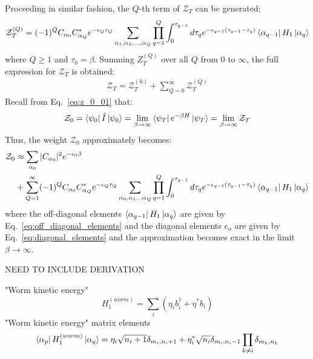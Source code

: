 \documentclass[12pt, two sided]{article}
\begin{document}
Proceeding in similar fashion, the $Q$-th term of $\mathcal{Z}_T$ can be generated:
\begin{equation}
\label{eq:Z^q}
\mathcal{Z}_T^{(Q)} = (-1)^{Q}  C_{\alpha_0} C_{\alpha_Q}^* e^{-\epsilon_{Q} \tau_Q} \sum_{\alpha_1,\alpha_2,\dots,\alpha_Q} \prod_{q=1}^Q \int_0^{\tau_{q-1}} d\tau_q e^{-\epsilon_{q-1}(\tau_{q-1}-\tau_q)} 
\bra{\alpha_{q-1}} H_1 \ket{\alpha_q}
\end{equation}
where $Q \geq 1$ and $\tau_0 = \beta$. Summing $Z_T^{(Q)}$ over all $Q$ from $0$ to $\infty$, the full expression for $\mathcal{Z}_T$ is obtained:
%
\begin{equation}
\begin{aligned}
\mathcal{Z}_T = \mathcal{Z}_T^{(0)} + \sum_{Q=0}^{\infty} \mathcal{Z}_T^{(Q)}
\end{aligned}
\end{equation}
%
Recall from Eq.~\eqref{eq:z_0_01} that:
%
\begin{equation}
\mathcal{Z}_0 = \bra{\psi_0} \hat{I} \ket{\psi_0} = \lim_{\beta\to\infty} \bra{\psi_T} e^{-\beta H} \ket{\psi_T} = \lim_{\beta\to\infty} \mathcal{Z}_T
\end{equation}
%
Thus, the weight $\mathcal{Z}_0$ approximately becomes:
\begin{equation}
\begin{aligned}
\label{eq:Z_0}
\mathcal{Z}_0 &\approx \sum_{\alpha_0} \vert C_{\alpha_0} \vert^2 e^{-\epsilon_{0} \beta} \\ &+ 
\sum_{Q=1}^{\infty} (-1)^Q C_{\alpha_0} C_{\alpha_Q}^* e^{-\epsilon_{Q} \tau_Q} \sum_{\alpha_0, \alpha_1 \dots \alpha_Q} \prod_{q=1}^Q \int_0^{\tau_{q-1}} d\tau_q e^{-\epsilon_{q-1}(\tau_{q-1}-\tau_q)} 
\bra{\alpha_{q-1}} H_1 \ket{\alpha_q}
\end{aligned}
\end{equation}
where the off-diagonal elements $\bra{\alpha_{q-1}} H_1 \ket{\alpha_q}$ are given by Eq.~\eqref{eq:off_diagonal_elements} and the diagonal elements $\epsilon_{\alpha}$ are given by Eq.~\eqref{eq:diagonal_elements} and the approximation becomes exact in the limit $\beta\to\infty$.

NEED TO INCLUDE DERIVATION 


"Worm kinetic energy"
%
\begin{equation}
H_1^{(worm)} = \sum_i (\eta_i b_i^\dag + \eta^* b_i)
\end{equation}
%
"Worm kinetic energy" matrix elements
%
\begin{equation}
\bra{\alpha_p} H_1^{(worm)} \ket{\alpha_q} = \eta_i \sqrt{n_i + 1} \delta_{m_i,n_{i}+1}  + \eta_i^* \sqrt{n_i} \delta_{m_i,n_{i}-1}  \prod_{k\neq i} \delta_{m_k,n_k}
\end{equation}
%
\end{document}
